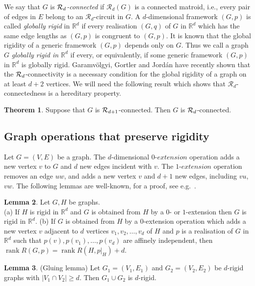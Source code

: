 \documentclass[11pt,a4paper]{article}
\theoremstyle{definition}
\newtheorem{theorem}{Theorem}[section]
\newtheorem{lemma}[theorem]{Lemma}
\DeclareMathOperator{\rank}{rank}
\newcommand{\cR}{\mathcal{R}}
\newcommand{\R}{\mathbb{R}}
\begin{document}
We say that $G$ is {\itshape ${\cal R}_d$-connected} if $\cR_d(G)$ is a connected matroid, i.e., every pair of edges in $E$ belong to an $\cR_d$-circuit in $G$. 
A $d$-dimensional framework $(G,p)$ is called {\it globally rigid} in $\R^d$
if every realisation $(G,q)$ of $G$ in $\R^d$ which has the same edge lengths as $(G,p)$ is congruent to $(G,p)$.
It is known that the global rigidity of a generic framework $(G,p)$ depends only on $G$. Thus we call a graph $G$ {\it globally rigid in $\R^d$} if every, or equivalently,
if some generic framework $(G,p)$ in $\R^d$ is globally rigid.
Garamv\"olgyi, Gortler and Jord\'an \cite{GGJ} have recently shown that the 
${\cal R}_d$-connectivity is a necessary condition for 
the global rigidity of a graph on at least $d+2$ vertices.
We will need the following result which shows that $\cR_d$-connectedness is a hereditary property.

\begin{theorem}\cite[Theorem 5.1]{GGJ}
\label{dimdrop}
Suppose that $G$ is ${\cal R}_{d+1}$-connected. Then $G$ is 
${\cal R}_{d}$-connected.
\end{theorem}



\subsection{Graph operations that preserve rigidity}\label{sec:op}




Let $G =(V,E)$ be a graph. The $d$-dimensional $0$-$extension$ operation adds a new vertex $v$ to $G$ and $d$ new edges incident with $v$. The $1$-$extension$ operation removes an edge $uw$, and adds a new vertex $v$ and $d+1$ new edges, including $vu$, $vw$.
The following lemmas are well-known, for a proof, see e.g.\ \cite{Wlong}.

\begin{lemma}
\label{lem:1ext}
Let $G,H$ be  graphs.\\
(a) If $H$ is rigid in $\R^d$ and $G$ is obtained from $H$ by a $0$- or
$1$-extension then $G$ is rigid in $\R^d$.
(b) If $G$ is obtained from $H$ by a $0$-extension operation which adds a new vertex $v$ adjacent to $d$ vertices  $v_1,v_2,\ldots,v_d$ of $H$ and $p$ is a realisation of $G$ in $\R^d$ such that $p(v),p(v_1),\ldots,p(v_d)$ are affinely independent, then $\rank R(G,p)=\rank R(H,p|_H)+d$.
\end{lemma}

\begin{lemma} (Gluing lemma)
\label{gluing}
Let $G_1=(V_1,E_1)$ and $G_2=(V_2,E_2)$ be $d$-rigid graphs with
$|V_1\cap V_2|\geq d$. Then $G_1\cup G_2$ is $d$-rigid.
\end{lemma}
\end{document}
